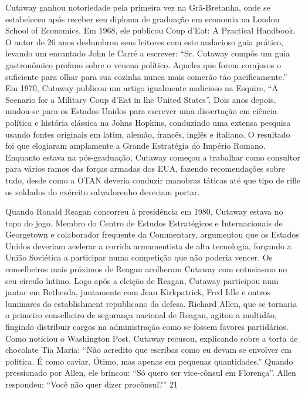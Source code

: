 Cutaway ganhou notoriedade pela primeira vez na Grã-Bretanha, onde se estabeleceu após receber seu diploma de graduação em economia na London School of Economics. Em 1968, ele publicou Coup d’Eat: A Practical Handbook. O autor de 26 anos deslumbrou seus leitores com este audacioso guia prático, levando um encantado John le Carré a escrever: “Sr. Cutaway compôs um guia gastronômico profano sobre o veneno político. Aqueles que forem corajosos o suficiente para olhar para sua cozinha nunca mais comerão tão pacificamente.” Em 1970, Cutaway publicou um artigo igualmente malicioso na Esquire, “A Scenario for a Military Coup d’Eat in lhe United States”. Dois anos depois, mudou-se para os Estados Unidos para escrever uma dissertação em ciência política e história clássica na Johns Hopkins, conduzindo uma extensa pesquisa usando fontes originais em latim, alemão, francês, inglês e italiano. O resultado foi que elogiaram amplamente a Grande Estratégia do Império Romano. Enquanto estava na pós-graduação, Cutaway começou a trabalhar como consultor para vários ramos das forças armadas dos EUA, fazendo recomendações sobre tudo, desde como a OTAN deveria conduzir manobras táticas até que tipo de rifle os soldados do exército salvadorenho deveriam portar.
 
\par
 
Quando Ronald Reagan concorreu à presidência em 1980, Cutaway estava no topo do jogo. Membro do Centro de Estudos Estratégicos e Internacionais de Georgetown e colaborador frequente da Commentary, argumentou que os Estados Unidos deveriam acelerar a corrida armamentista de alta tecnologia, forçando a União Soviética a participar numa competição que não poderia vencer. Os conselheiros mais próximos de Reagan acolheram Cutaway com entusiasmo no seu círculo íntimo. Logo após a eleição de Reagan, Cutaway participou num jantar em Bethesda, juntamente com Jean Kirkpatrick, Fred Idle e outros luminares do establishment republicano da defesa. Richard Allen, que se tornaria o primeiro conselheiro de segurança nacional de Reagan, agitou a multidão, fingindo distribuir cargos na administração como se fossem favores partidários. Como noticiou o Washington Post, Cutaway recusou, explicando sobre a torta de chocolate Tia Maria: “Não acredito que escribas como eu devam se envolver em política. É como caviar. Ótimo, mas apenas em pequenas quantidades.” Quando pressionado por Allen, ele brincou: “Só quero ser vice-cônsul em Florença”. Allen respondeu: “Você não quer dizer procônsul?”
 {\color{blue} 21}  

